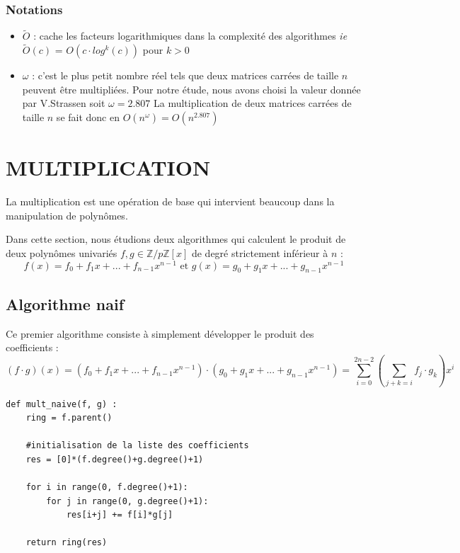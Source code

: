 \documentclass[a4paper]{article}
\begin{document}
\subsubsection*{Notations}
\begin{itemize}
\item $\tilde{O}$ : cache les facteurs logarithmiques dans la complexité des algorithmes \textit{ie} $\tilde{O}(c)$ = $O(c\cdot log^{k}(c))$ pour $k>0$
\item $\omega$ : c'est le plus petit nombre réel tels que deux matrices carrées de taille $n$ peuvent être multipliées. Pour notre étude, nous avons choisi la valeur donnée par V.Strassen soit $\omega=2.807$
La multiplication de deux matrices carrées de taille $n$ se fait donc en $O(n^\omega)=O(n^{2.807})$
\end{itemize}


\section{MULTIPLICATION}

La multiplication est une opération de base qui intervient beaucoup dans la manipulation de polynômes.

Dans cette section, nous étudions deux algorithmes qui calculent le produit de deux polynômes univariés $f,g \in \mathbb{Z}/p\mathbb{Z}[x]$ de degré strictement inférieur à $n$ :
\[
f(x)=f_0+f_1x+...+f_{n-1}x^{n-1}\text{ et }g(x)=g_0+g_1x+...+g_{n-1}x^{n-1}
\]

\subsection{Algorithme naif}

Ce premier algorithme consiste à simplement développer le produit des coefficients :
\[
(f\cdot g)(x)=(f_0+f_1x+...+f_{n-1}x^{n-1})\cdot (g_0+g_1x+...+g_{n-1}x^{n-1})=\sum_{i=0}^{2n-2} (\sum_{j+k=i}f_j\cdot g_k) x^i
\]

\begin{lstlisting}[title={multiplication naive}]
    def mult_naive(f, g) :
    ring = f.parent()

    #initialisation de la liste des coefficients
    res = [0]*(f.degree()+g.degree()+1) 
    
    for i in range(0, f.degree()+1):
        for j in range(0, g.degree()+1):
            res[i+j] += f[i]*g[j]

    return ring(res) 
\end{lstlisting}
\end{document}
